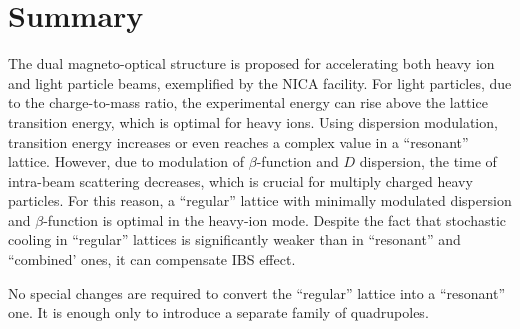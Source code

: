 \documentclass[submitting]{nst}
\begin{document}
	\section{Summary} \label{sec.IV}
	
	\par The dual magneto-optical structure is proposed for accelerating both heavy ion and light particle beams, exemplified by the NICA facility. For light particles, due to the charge-to-mass ratio, the experimental energy can rise above the lattice transition energy, which is optimal for heavy ions. Using dispersion modulation, transition energy increases or even reaches a complex value in a “resonant” lattice. However, due to modulation of $\beta$-function and $D$ dispersion, the time of intra-beam scattering decreases, which is crucial for multiply charged heavy particles. For this reason, a “regular” lattice with minimally modulated dispersion and $\beta$-function is optimal in the heavy-ion mode. Despite the fact that stochastic cooling in “regular” lattices is significantly weaker than in “resonant” and “combined’ ones, it can compensate IBS effect.
	\par No special changes are required to convert the “regular” lattice into a “resonant” one. It is enough only to introduce a separate family of quadrupoles.
	
\end{document}
